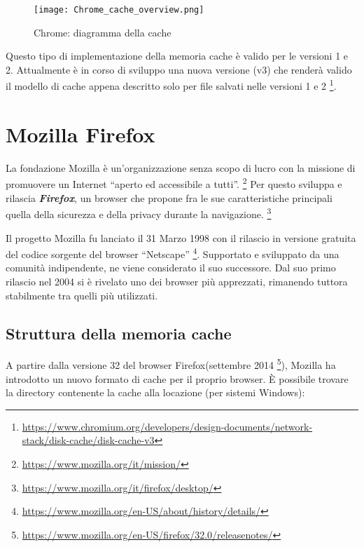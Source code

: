 \begin{figure}[htpb]
	\begin{center}
		\texttt{[image: Chrome\_cache\_overview.png]}
	\end{center}
	\caption[Chrome: diagramma della cache]{Chrome: diagramma della cache \footnotemark}
\end{figure}

Questo tipo di implementazione della memoria cache è valido per le versioni 1 e 2. Attualmente è in corso di sviluppo una nuova versione (v3) che renderà valido il modello di cache appena descritto solo per file salvati nelle versioni 1 e 2 \footnote{\url{https://www.chromium.org/developers/design-documents/network-stack/disk-cache/disk-cache-v3}}.
\clearpage

\section{Mozilla Firefox}

La fondazione Mozilla è un'organizzazione senza scopo di lucro con la missione di promuovere un Internet ``aperto ed accessibile a tutti''. \footnote{\url{https://www.mozilla.org/it/mission/}} 
Per questo sviluppa e rilascia \textbf{\textit{Firefox}}, un browser che propone fra le sue caratteristiche principali quella della sicurezza e della privacy durante la navigazione. \footnote{\url{https://www.mozilla.org/it/firefox/desktop/}}

Il progetto Mozilla fu lanciato il 31 Marzo 1998 con il rilascio in versione gratuita del codice sorgente del browser ``Netscape'' \footnote{\url{https://www.mozilla.org/en-US/about/history/details/}}. Supportato e sviluppato da una comunità indipendente, ne viene considerato il suo successore. Dal suo primo rilascio nel 2004 si è rivelato uno dei browser più apprezzati, rimanendo tuttora stabilmente tra quelli più utilizzati. 

\subsection{Struttura della memoria cache}

A partire dalla versione 32 del browser Firefox(settembre 2014 \footnote{\url{https://www.mozilla.org/en-US/firefox/32.0/releasenotes/}}), Mozilla ha introdotto un nuovo formato di cache per il proprio browser. \`E possibile trovare la directory contenente la cache alla locazione (per sistemi Windows):

